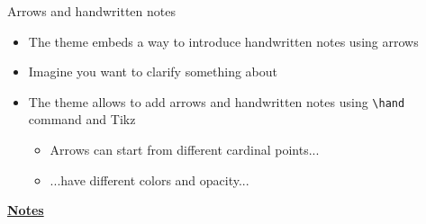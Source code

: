 \documentclass[10pt]{beamer}
\begin{document}
\begin{frame}[t]
    {Arrows and handwritten notes}\bigskip
    \begin{itemize}
        \item The theme embeds a way to introduce handwritten notes using arrows \bigskip\medskip
        \item Imagine you want to clarify something about  \bigskip\medskip
       \item The theme allows to add arrows and handwritten notes using \texttt{\textbackslash hand} command and Tikz \medskip
        \begin{itemize}
            \item Arrows can start from different cardinal points... \medskip
            \item ...have different colors and opacity... \medskip
        \end{itemize}
    \end{itemize}
\end{frame}
\begin{flushleft}
    \underline{\textbf{Notes}}\setlength{\parskip}{.15cm}\notesize\newline\par
\end{flushleft}
\end{document}
